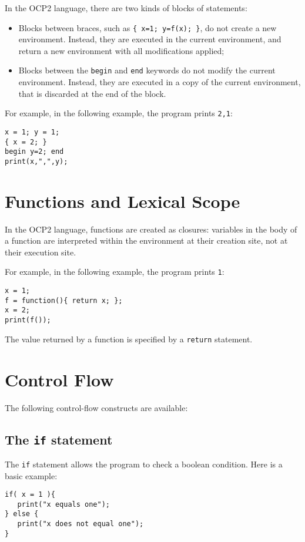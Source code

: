 In the OCP2 language, there are two kinds of blocks of statements:
\begin{itemize}
\item Blocks between braces, such as \verb+{ x=1; y=f(x); }+, do not
  create a new environment. Instead, they are executed in the current
  environment, and return a new environment with all modifications
  applied;
\item Blocks between the \verb+begin+ and \verb+end+ keywords do not
  modify the current environment. Instead, they are executed in a copy
  of the current environment, that is discarded at the end of the
  block.
\end{itemize}

For example, in the following example, the program prints \verb+2,1+:
\begin{verbatim}
x = 1; y = 1;
{ x = 2; }
begin y=2; end
print(x,",",y);
\end{verbatim}

\section{Functions and Lexical Scope}

In the OCP2 language, functions are created as closures: variables
in the body of a function are interpreted within the environment
at their creation site, not at their execution site.

For example, in the following example, the program prints \verb+1+:
\begin{verbatim}
x = 1;
f = function(){ return x; };
x = 2;
print(f());
\end{verbatim}

The value returned by a function is specified by a {\tt return} statement.

\section{Control Flow}

The following control-flow constructs are available:

\subsection{The {\tt if} statement}

The \verb+if+ statement allows the program to check a boolean
condition.  Here is a basic example:

\begin{verbatim}
if( x = 1 ){
   print("x equals one");
} else {
   print("x does not equal one");
}
\end{verbatim}

